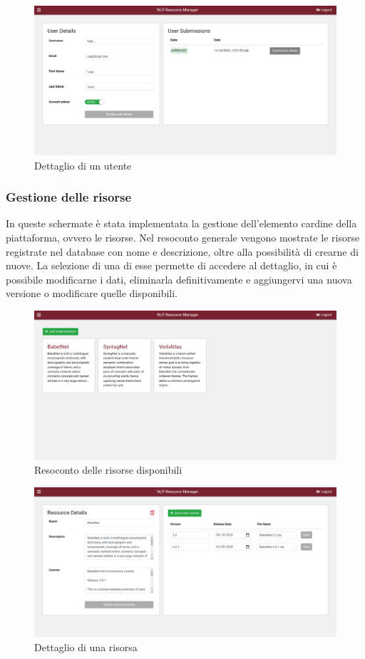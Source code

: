 \begin{figure}[H]
	\centering
	\includegraphics[width=\textwidth]{assets/ui/user-details.png}
	\caption{Dettaglio di un utente}
	\label{fig:user-details}
\end{figure}

\subsubsection{Gestione delle risorse}
In queste schermate è stata implementata la gestione dell'elemento cardine della
piattaforma, ovvero le risorse. Nel resoconto generale vengono mostrate le risorse
registrate nel database con nome e descrizione, oltre alla possibilità di crearne
di nuove. La selezione di una di esse permette di accedere al dettaglio, in cui
è possibile modificarne i dati, eliminarla definitivamente e aggiungervi una nuova
versione o modificare quelle disponibili.

\begin{figure}[H]
	\centering
	\includegraphics[width=\textwidth]{assets/ui/resources-list.png}
	\caption{Resoconto delle risorse disponibili}
	\label{fig:resources-list}
\end{figure}

\begin{figure}[H]
	\centering
	\includegraphics[width=\textwidth]{assets/ui/resource-details.png}
	\caption{Dettaglio di una risorsa}
	\label{fig:resource-details}
\end{figure}